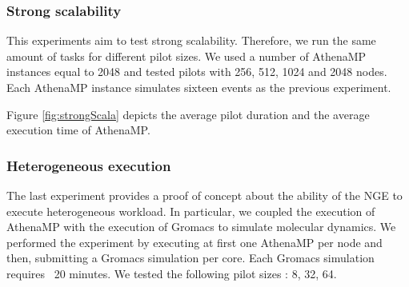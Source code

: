 \subsubsection{Strong scalability}
This experiments aim to test strong scalability. Therefore, we run the same amount of tasks for different pilot sizes. 
We used a number of AthenaMP instances equal to 2048 and tested pilots with 256, 512, 1024 and 2048 nodes. 
Each AthenaMP instance simulates sixteen events as the previous experiment.

Figure \ref{fig:strongScala} depicts the average pilot duration and  the average execution time of AthenaMP.  


 
\subsubsection{Heterogeneous execution}

The last experiment provides a proof of concept about the ability of the NGE to execute heterogeneous workload.
In particular, we coupled the execution of AthenaMP with the execution of Gromacs to simulate molecular dynamics. 
We performed the experiment by executing at first one AthenaMP per node and then, submitting a Gromacs simulation per core. Each Gromacs simulation requires ~20 minutes.
We tested the following pilot sizes : 8, 32, 64. 



%
%
